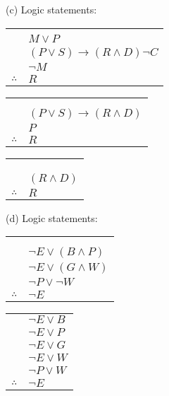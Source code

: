 \documentclass{article}
\begin{document}
(c) Logic statements:
\newline
\begin{tabular}{c@{\,}l@{}} 
                         & \\
                         & $M \vee P$ \\
                         & $(P \vee S) \rightarrow (R \wedge D) \neg C$ \\
                         & $\neg M$ \\
\arrayrulecolor{blue}
\cline{2-2}
    $\therefore$         & $R$ \\
\end{tabular}
\begin{tabular}{c@{\,}l@{}} 
                         & \\
                         & \\
                         & $(P \vee S) \rightarrow (R \wedge D)$\\
                         & $P$ \\
\arrayrulecolor{blue}
\cline{2-2}
    $\therefore$         & $R$ \\
\end{tabular}
\begin{tabular}{c@{\,}l@{}} 
                         & \\
                         & \\
                         & \\
                         & $(R \wedge D)$\\
\arrayrulecolor{blue}
\cline{2-2}
    $\therefore$         & $R$ \\
\end{tabular}
\newline
(d) Logic statements:
\newline
\begin{tabular}{c@{\,}l@{}} 
                         & \\ & \\
                         & $\neg E \vee (B \wedge P)$ \\
                         & $\neg E \vee (G \wedge W)$ \\
                         & $\neg P \vee \neg W$ \\
\arrayrulecolor{blue}
\cline{2-2}
    $\therefore$         & $\neg E$ \\
\end{tabular}
\begin{tabular}{c@{\,}l@{}} 
                         & $\neg E \vee B$ \\
                         & $\neg E \vee P$ \\
                         & $\neg E \vee G$ \\
                         & $\neg E \vee W$ \\
                         & $\neg P \vee W$ \\
\arrayrulecolor{blue}
\cline{2-2}
    $\therefore$         & $\neg E$ \\
\end{tabular}
\end{document}
